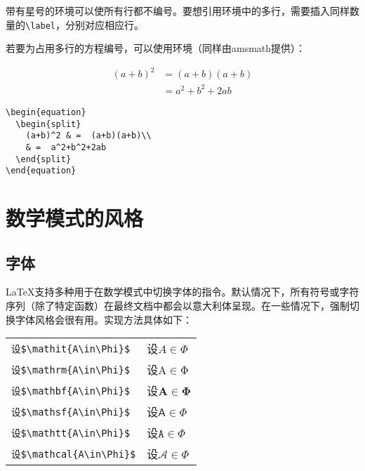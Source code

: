\begin{ii}
带有星号的环境可以使所有行都不编号。要想引用环境中的多行，需要插入同样数量的\verb|\label|，分别对应相应行。
\end{ii}

若要为占用多行的方程编号，可以使用环境（同样由\textsf{amsmath}提供）：

\begin{codelist}[3.23]{
  \begin{equation}
    \begin{split}
      (a+b)^2 & =  (a+b)(a+b)\\
      & =  a^2+b^2+2ab
    \end{split}
  \end{equation}
}\begin{verbatim}
\begin{equation}
  \begin{split}
    (a+b)^2 & =  (a+b)(a+b)\\
    & =  a^2+b^2+2ab
  \end{split}
\end{equation}
\end{verbatim}
\end{codelist}

\section{数学模式的风格}

\subsection{字体}

\LaTeX 支持多种用于在数学模式中切换字体的指令。默认情况下，所有符号或字符序列（除了特定函数）在最终文档中都会以意大利体呈现。在一些情况下，强制切换字体风格会很有用。实现方法具体如下：

\begin{center}
  \begin{tabular}{ll}
    \verb|设$\mathit{A\in\Phi}$| & 设$\mathit{A\in Φ}$\\
    \verb|设$\mathrm{A\in\Phi}$| & 设$\mathrm{A\in Φ}$\\
    \verb|设$\mathbf{A\in\Phi}$| & 设$\mathbf{A\in Φ}$\\
    \verb|设$\mathsf{A\in\Phi}$| & 设$\mathsf{A\in Φ}$\\
    \verb|设$\mathtt{A\in\Phi}$| & 设$\mathtt{A\in Φ}$\\
    \verb|设$\mathcal{A\in\Phi}$| & 设$\mathcal{A\in\Phi}$\\
  \end{tabular}
\end{center}


